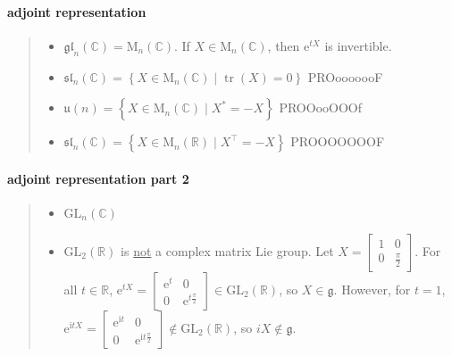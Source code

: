 \documentclass[letterpaper, 10pt]{article}
\theoremstyle{theostyle}
\begin{document}
\paragraph{adjoint representation}
\begin{quote}
\begin{itemize}
    \item \(\mathfrak{gl}_n (\mathbb{C}) = \mathrm{M}_n (\mathbb{C}) \).
    If \(X \in \mathrm{M}_n ( \mathbb{C})\), then \(\mathrm{e}^{tX}\) is invertible.
    \item \(\mathfrak{sl}_n (\mathbb{C}) = \left\{X \in \mathrm{M}_n (\mathbb{C}) \mid \operatorname{tr}{(X)} = 0 \right\}\)
    PROooooooF
    \item \(\mathfrak{u}(n) = \left\{X \in \mathrm{M}_n (\mathbb{C}) \mid X^* = -X \right\}\)
    PROOooOOOf
    \item \(\mathfrak{sl}_n (\mathbb{C}) = \left\{X \in \mathrm{M}_n (\mathbb{R}) \mid X^\top = -X \right\}\)
    PROOOOOOOF
\end{itemize}
\end{quote}

\paragraph{adjoint representation part 2}
\begin{quote}
\begin{itemize}
    \item \(\mathrm{GL}_n(\mathbb{C})\)
    \item \(\mathrm{GL}_2(\mathbb{R})\) is \underline{not} a complex matrix Lie group.
    Let \(X = \begin{bmatrix}
        1 & 0 \\
        0 & \frac{\pi}{2}
    \end{bmatrix}\).
    For all \(t \in \mathbb{R}\),
    \(\mathrm{e}^{tX} = \begin{bmatrix}
        \mathrm{e}^t & 0 \\
        0 & \mathrm{e}^{t\frac{\pi}{2}}
    \end{bmatrix} \in \mathrm{GL}_2(\mathbb{R})\), so \(X \in \mathfrak{g}\).
    However, for \(t = 1\), \(\mathrm{e}^{\mathrm{i}tX} = \begin{bmatrix}
        \mathrm{e}^{\mathrm{i}t} & 0 \\
        0 & \mathrm{e}^{\mathrm{i}t\frac{\pi}{2}}
    \end{bmatrix} \notin \mathrm{GL}_2(\mathbb{R})\), so \(iX \notin \mathfrak{g}\).
\end{itemize}
\end{quote}
\end{document}
